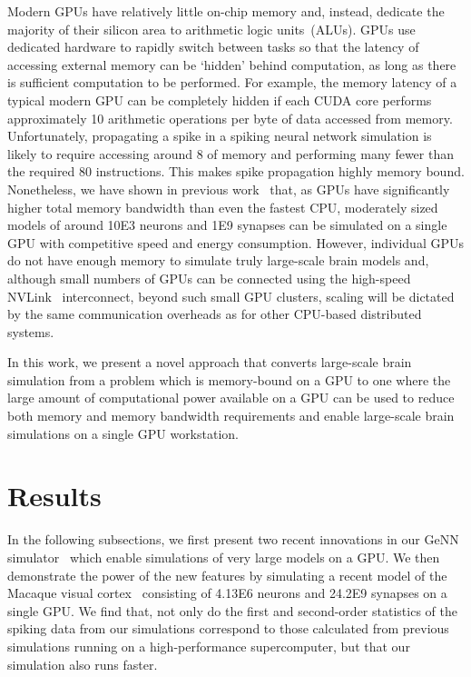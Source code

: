 \documentclass[9pt,twocolumn,twoside,lineno]{pnas-new}
\begin{document}
Modern GPUs have relatively little on-chip memory and, instead, dedicate the majority of their silicon area to arithmetic logic units~(ALUs).
GPUs use dedicated hardware to rapidly switch between tasks so that the latency of accessing external memory can be `hidden' behind computation, as long as there is sufficient computation to be performed.
For example, the memory latency of a typical modern GPU can be completely hidden if each CUDA core performs approximately 10 arithmetic operations per byte of data accessed from memory.
Unfortunately, propagating a spike in a spiking neural network simulation is likely to require accessing around \SI{8}{\byte} of memory and performing many fewer than the required 80 instructions. 
This makes spike propagation highly memory bound.
Nonetheless, we have shown in previous work~\citep{Knight2018} that, as GPUs have significantly higher total memory bandwidth than even the fastest CPU, moderately sized models of around \num{10E3} neurons and \num{1E9} synapses can be simulated on a single GPU with competitive speed and energy consumption.
However, individual GPUs do not have enough memory to simulate truly large-scale brain models and, although small numbers of GPUs can be connected using the high-speed NVLink~\citep{NVIDIACorporation} interconnect, beyond such small GPU clusters, scaling will be dictated by the same communication overheads as for other CPU-based distributed systems.

In this work, we present a novel approach that converts large-scale brain simulation from a problem which is memory-bound on a GPU to one where the large amount of computational power available on a GPU can be used to reduce both memory and memory bandwidth requirements and enable large-scale brain simulations on a single GPU workstation.

\section*{Results}
In the following subsections, we first present two recent innovations in our GeNN simulator~\citep{Yavuz2016} which enable simulations of very large models on a GPU.
We then demonstrate the power of the new features by simulating a recent model of the Macaque visual cortex~\citep{Schmidt2018} consisting of \num{4.13E6} neurons and \num{24.2E9} synapses on a single GPU.
We find that, not only do the first and second-order statistics of the spiking data from our simulations correspond to those calculated from previous simulations running on a high-performance supercomputer, but that our simulation also runs faster.
\end{document}
